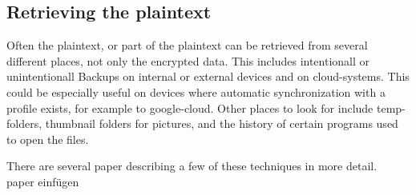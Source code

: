 \subsection{Retrieving the plaintext}
Often the plaintext, or part of the plaintext can be retrieved from several different places, not only
the encrypted data. This includes intentionall or unintentionall Backups
on internal or external devices and on cloud-systems. 
This could be especially useful on devices where automatic synchronization with
a profile exists, for example to google-cloud.
Other places to look for include temp-folders, thumbnail folders for pictures, and
the history of certain programs used to open the files.

There are several paper describing a few of these techniques in more detail.
\\paper einfügen
